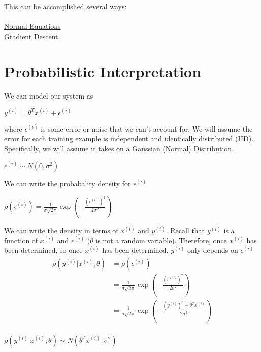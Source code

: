 \documentclass{article}
\begin{document}
This can be accomplished several ways:\\
\\
\href{normal-equations.pdf}{Normal Equations}\\
\href{gradient-descent.pdf}{Gradient Descent}\\

\section{Probabilistic Interpretation}
We can model our system as
\begin{center}
$y^{(i)} = \theta^Tx^{(i)} + \epsilon^{(i)}$
\end{center}
where $\epsilon^{(i)}$ is some error or noise that we can't account for. We will assume the error for each training example is independent and identically distributed (IID). Specifically, we will assume it takes on a Gaussian (Normal) Distribution.


\begin{center}
$\epsilon^{(i)} \sim N(0,\sigma^2)$\\
\end{center}

We can write the probabality density for $\epsilon^{(i)}$
\begin{center}
$\rho(\epsilon^{(i)}) = \frac{1}{\sigma\sqrt{2\pi}} \exp(-\frac{(\epsilon^{(i)})^2}{2\sigma^2})$\\
\end{center}

We can write the density in terms of $x^{(i)}$ and $y^{(i)}$. Recall that $y^{(i)}$ is a function of $x^{(i)}$ and $\epsilon^{(i)}$ ($\theta$ is not a random variable). Therefore, once $x^{(i)}$ has been determined, so once $x^{(i)}$ has been determined, $y^{(i)}$ only depends on $\epsilon^{(i)}$\\
\begin{align*}
\rho(y^{(i)}|x^{(i)} ; \theta) &= \rho(\epsilon^{(i)})\\
&= \frac{1}{\sigma\sqrt{2\pi}} \exp(-\frac{(\epsilon^{(i)})^2}{2\sigma^2})\\
&= \frac{1}{\sigma\sqrt{2\pi}} \exp(-\frac{(y^{(i)})^2-\theta^Tx^{(i)}}{2\sigma^2})\\
\end{align*}

\begin{center}
$\rho(y^{(i)}|x^{(i)} ; \theta) \sim N(\theta^Tx^{(i)}, \sigma^2)$\\
\end{center}
\end{document}
